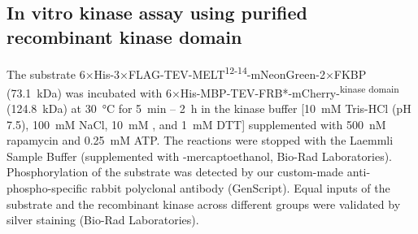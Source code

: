 \subsection{In vitro kinase assay using purified recombinant  kinase domain}
The substrate 6×His-3×FLAG-TEV-MELT\textsuperscript{12-14}-mNeonGreen-2×FKBP (\SI{73.1}{kDa}) was incubated with 6×His-MBP-TEV-FRB*-mCherry-\textsuperscript{kinase domain} (\SI{124.8}{kDa}) at \SI{30}{\celsius} for \SI{5}{min} -- \SI{2}{h} in the kinase buffer [\SI{10}{mM} Tris-HCl (pH 7.5), \SI{100}{mM} NaCl, \SI{10}{mM} , and \SI{1}{mM} DTT] supplemented with \SI{500}{nM} rapamycin and \SI{0.25}{mM} ATP. The reactions were stopped with the Laemmli Sample Buffer (supplemented with \textbeta-mercaptoethanol, Bio-Rad Laboratories). Phosphorylation of the substrate was detected by our custom-made anti- phospho-specific rabbit polyclonal antibody (GenScript). Equal inputs of the substrate and the recombinant kinase across different groups were validated by silver staining (Bio-Rad Laboratories).
